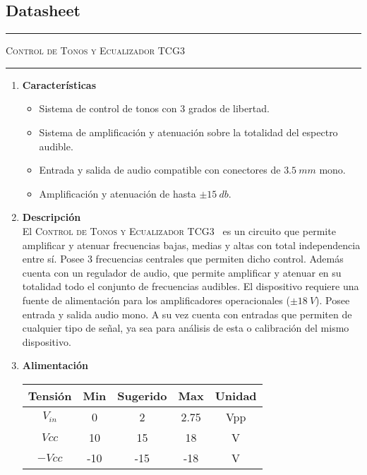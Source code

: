 




\subsection{Datasheet}
\begin{center}
\rule{\textwidth}{1pt}
\textsc{Control de Tonos y Ecualizador TCG3 \textsuperscript{\textregistered}}
\rule{\textwidth}{1pt}
\end{center}

\begin{multicols}{2}

\begin{enumerate}
	\item[1] \textbf{Características}
	\begin{itemize}
		\item Sistema de control de tonos con 3 grados de libertad.
		\item Sistema de amplificación y atenuación sobre la totalidad del espectro audible.
		\item Entrada y salida de audio compatible con conectores de $3.5 \ mm$ mono.
		\item Amplificación y atenuación de hasta $\pm 15 \ db$.
	\end{itemize}
	
	\item[2] \textbf{Descripción}\\
		El \textsc{Control de Tonos y Ecualizador TCG3~\textsuperscript{\textregistered}} es un circuito que permite amplificar y atenuar frecuencias bajas, medias y altas con total independencia entre sí. Posee 3 frecuencias centrales que permiten dicho control. Además cuenta con un regulador de audio, que permite amplificar y atenuar en su totalidad todo el conjunto de frecuencias audibles. El dispositivo requiere una fuente de alimentación para los amplificadores operacionales ($\pm 18 \ V$). Posee entrada y salida audio mono. A su vez cuenta con entradas que permiten de cualquier tipo de señal, ya sea para análisis de esta o calibración del mismo dispositivo.
	
	\item[3] \textbf{Alimentación}
	\begin{table}[H]
		\begin{tabular}{ccccc}
			\hline	
			Tensión & Min & Sugerido & Max & Unidad \\
			\hline
			$V_{in}$    & 0 	& 2		   & 2.75	 	& Vpp \\
			$Vcc$       & 10  	& 15       & 18 	& V \\
			$-Vcc$      & -10 	& -15      & -18 	& V	\\
			\hline
		\end{tabular}
	\end{table}
		

\end{enumerate}
\end{multicols}
